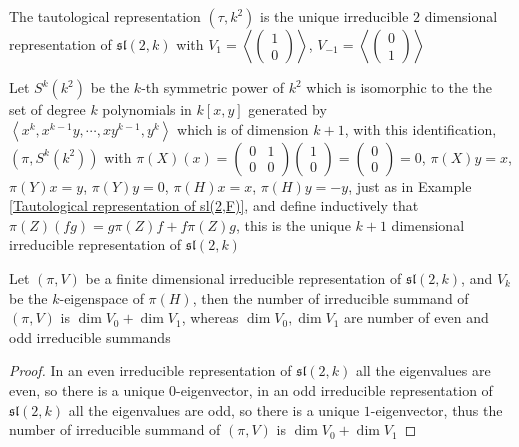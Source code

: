 \documentclass[main]{subfiles}
\begin{document}
\begin{example}\label{Tautological representation of sl(2,F)}
The tautological representation $(\tau,k^2)$ is the unique irreducible $2$ dimensional representation of $\mathfrak{sl}(2,k)$ with $V_{1}=\left\langle\begin{pmatrix}
1 \\
0
\end{pmatrix}\right\rangle$, $V_{-1}=\left\langle\begin{pmatrix}
0 \\
1
\end{pmatrix}\right\rangle$
\end{example}

\begin{example}
Let $S^k\left(k^2\right)$ be the $k$-th symmetric power of $k^2$ which is isomorphic to the the set of degree $k$ polynomials in $k[x,y]$ generated by \\
$\left\langle x^k,x^{k-1}y,\cdots,xy^{k-1},y^k\right\rangle$ which is of dimension $k+1$, with this identification, $\left(\pi,S^k\left(k^2\right)\right)$ with $\pi(X)(x)=\begin{pmatrix}
0&1 \\
0&0
\end{pmatrix}\begin{pmatrix}
1 \\
0
\end{pmatrix}=\begin{pmatrix}
0 \\
0
\end{pmatrix}=0$, $\pi(X)y=x$, $\pi(Y)x=y$, $\pi(Y)y=0$, $\pi(H)x=x$, $\pi(H)y=-y$, just as in Example \ref{Tautological representation of sl(2,F)}, and define inductively that $\pi(Z)(fg)=g\pi(Z)f+f\pi(Z)g$, this is the unique $k+1$ dimensional irreducible representation of $\mathfrak{sl}(2,k)$
\end{example}

\begin{lemma}\label{Count the number irreducible summand of a representation of sl(2,F)}
Let $(\pi,V)$ be a finite dimensional irreducible representation of $\mathfrak{sl}(2,k)$, and $V_k$ be the $k$-eigenspace of $\pi(H)$, then the number of irreducible summand of $(\pi,V)$ is $\dim V_0+\dim V_1$, whereas $\dim V_0,\dim V_1$ are number of even and odd irreducible summands
\end{lemma}

\begin{proof}
In an even irreducible representation of $\mathfrak{sl}(2,k)$ all the eigenvalues are even, so there is a unique $0$-eigenvector, in an odd irreducible representation of $\mathfrak{sl}(2,k)$ all the eigenvalues are odd, so there is a unique $1$-eigenvector, thus the number of irreducible summand of $(\pi,V)$ is $\dim V_0+\dim V_1$
\end{proof}
\end{document}
